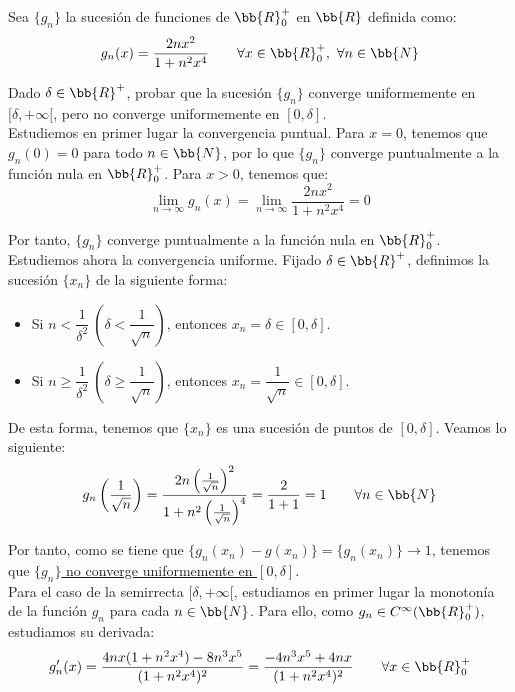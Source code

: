 \begin{ejercicio}
    Sea $\{g_n\}$ la sucesión de funciones de $\bb{R}^+_0$ en $\bb{R}$ definida como:
    \begin{equation*}
        g_n(x) = \frac{2nx^2}{1+n^2x^4} \qquad \forall x\in \bb{R}^+_0,~\forall n\in \bb{N}
    \end{equation*}

    Dado $\delta\in \bb{R}^+$, probar que la sucesión $\{g_n\}$ converge uniformemente en $[\delta,+\infty[$, pero no
    converge uniformemente en $[0,\delta]$.\\


    Estudiemos en primer lugar la convergencia puntual. Para $x=0$, tenemos que $g_n(0)=0$ para todo $n\in \bb{N}$, por lo que $\{g_n\}$ converge puntualmente a la función nula en $\bb{R}^+_0$. Para $x>0$, tenemos que:
    \begin{equation*}
        \lim_{n\to \infty} g_n(x) = \lim_{n\to \infty} \frac{2nx^2}{1+n^2x^4} = 0
    \end{equation*}

    Por tanto, $\{g_n\}$ converge puntualmente a la función nula en $\bb{R}^+_0$.\\

    Estudiemos ahora la convergencia uniforme. Fijado $\delta\in \bb{R}^+$, definimos la sucesión $\{x_n\}$ de la siguiente forma:
    \begin{itemize}
        \item Si $n < \dfrac{1}{\delta^2}~\left(\delta < \dfrac{1}{\sqrt{n}}\right)$, entonces $x_n = \delta \in [0,\delta]$.
        \item Si $n \geq \dfrac{1}{\delta^2}~\left(\delta \geq \dfrac{1}{\sqrt{n}}\right)$, entonces $x_n = \dfrac{1}{\sqrt{n}}\in [0,\delta]$.
    \end{itemize}

    De esta forma, tenemos que $\{x_n\}$ es una sucesión de puntos de $[0,\delta]$. Veamos lo siguiente:
    \begin{equation*}
        g_n\left(\frac{1}{\sqrt{n}}\right) = \frac{2n\left(\frac{1}{\sqrt{n}}\right)^2}{1+n^2\left(\frac{1}{\sqrt{n}}\right)^4} =
        \frac{2}{1+1}=1 \qquad \forall n\in \bb{N}
    \end{equation*}

    Por tanto, como se tiene que $\{g_n(x_n)-g(x_n)\}=\{g_n(x_n)\}\to 1$, tenemos que \ul{$\{g_n\}$ no converge uniformemente en $[0,\delta]$}.\\

    Para el caso de la semirrecta $[\delta,+\infty[$, estudiamos en primer lugar la monotonía de la función $g_n$ para cada $n\in \bb{N}$. Para ello, como $g_n\in C^\infty(\bb{R}^+_0)$, estudiamos
    su derivada:
    \begin{equation*}
        g_n'(x) = \frac{4nx(1+n^2x^4)-8n^3x^5}{(1+n^2x^4)^2} = \frac{-4n^3x^5+4nx}{(1+n^2x^4)^2} \qquad \forall x\in \bb{R}^+_0
    \end{equation*}


\end{ejercicio}
